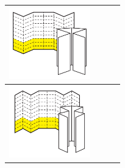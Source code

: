 \documentclass[10 pt,usenames,dvipsnames, oneside]{article}
\begin{document}
\begin{longtable}{|m{}|m{}|m{}|m{}|}
\hline
\includegraphics[width=100pt, keepaspectratio]{ativ2_fig05.png}  &                                     &                                  &                                                   \\
\hline
\includegraphics[width=100pt, keepaspectratio]{ativ2_fig06.png} &                                     &                                  &                                                   \\
\hline
\end{longtable}
\end{document}
